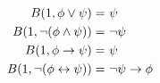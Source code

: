   $\begin{aligned}
    B(1, \phi \lor \psi) =&\  \psi\\
    B(1, \lnot (\phi \land \psi)) =&\  \lnot \psi\\
    B(1, \phi \to \psi) =&\  \psi\\
    B(1, \lnot (\phi \leftrightarrow \psi)) =&\  \lnot \psi \to \phi
  \end{aligned}$